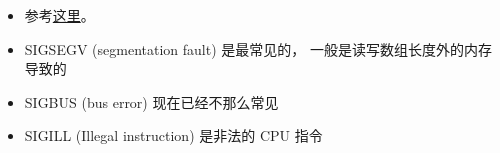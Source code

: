 
\begin{issues}
\issueDraft
\end{issues}

\begin{itemize}
\item 参考\href{https://unix.stackexchange.com/questions/6332/what-causes-various-signals-to-be-sent}{这里}。
\item SIGSEGV (segmentation fault) 是最常见的， 一般是读写数组长度外的内存导致的
\item SIGBUS (bus error) 现在已经不那么常见
\item SIGILL (Illegal instruction) 是非法的 CPU 指令
\end{itemize}
